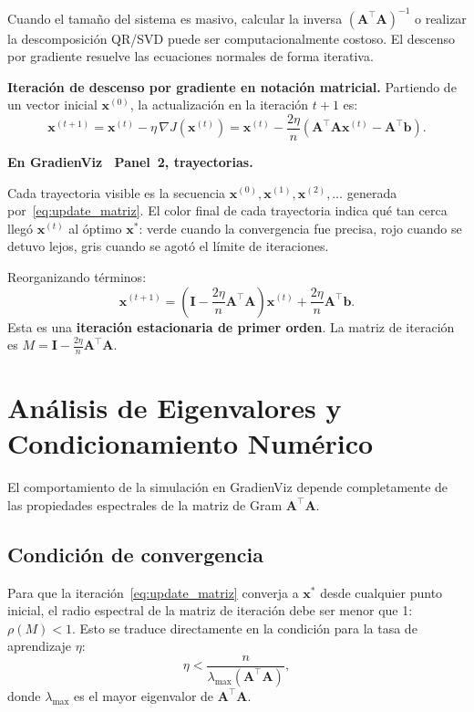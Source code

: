 ﻿\documentclass[12pt, a4paper]{article}
\newenvironment{viznota}[1]{%
    \begin{mdframed}[style=vizverde]
    \textbf{\color{bordeteo}En GradienViz \textemdash\ #1.}\quad
}{%
    \end{mdframed}
}
\newenvironment{vizdef}{%
    \begin{mdframed}[style=vizazul]
}{%
    \end{mdframed}
}
\newcommand{\grad}{\nabla}
\newcommand{\T}{{\top}}
\begin{document}
Cuando el tamaño del sistema es masivo, calcular la inversa $(\mathbf{A}^\T \mathbf{A})^{-1}$ o realizar la descomposición QR/SVD puede ser computacionalmente costoso. El descenso por gradiente resuelve las ecuaciones normales de forma iterativa.

\begin{vizdef}
\textbf{Iteración de descenso por gradiente en notación matricial.} Partiendo de un vector inicial $\mathbf{x}^{(0)}$, la actualización en la iteración $t+1$ es:
\begin{equation}\label{eq:update_matriz}
    \mathbf{x}^{(t+1)} = \mathbf{x}^{(t)} - \eta \, \grad J(\mathbf{x}^{(t)})
    = \mathbf{x}^{(t)} - \frac{2\eta}{n} \left(
        \mathbf{A}^\T \mathbf{A} \mathbf{x}^{(t)} - \mathbf{A}^\T \mathbf{b}
    \right).
\end{equation}
\end{vizdef}

\begin{viznota}{Panel~2, trayectorias}
Cada trayectoria visible es la secuencia $\mathbf{x}^{(0)}, \mathbf{x}^{(1)}, \mathbf{x}^{(2)}, \ldots$ generada por~\eqref{eq:update_matriz}. El color final de cada trayectoria indica qué tan cerca llegó $\mathbf{x}^{(t)}$ al óptimo $\mathbf{x}^*$: verde cuando la convergencia fue precisa, rojo cuando se detuvo lejos, gris cuando se agotó el límite de iteraciones.
\end{viznota}

Reorganizando términos:
\[
    \mathbf{x}^{(t+1)} = \left(
        \mathbf{I} - \frac{2\eta}{n} \mathbf{A}^\T \mathbf{A}
    \right) \mathbf{x}^{(t)} + \frac{2\eta}{n} \mathbf{A}^\T \mathbf{b}.
\]
Esta es una \textbf{iteración estacionaria de primer orden}. La matriz de iteración es $M = \mathbf{I} - \frac{2\eta}{n} \mathbf{A}^\T \mathbf{A}$.

\section{Análisis de Eigenvalores y Condicionamiento Numérico}

El comportamiento de la simulación en GradienViz depende completamente de las propiedades espectrales de la matriz de Gram $\mathbf{A}^\T \mathbf{A}$.

\subsection{Condición de convergencia}

Para que la iteración~\eqref{eq:update_matriz} converja a $\mathbf{x}^*$ desde cualquier punto inicial, el radio espectral de la matriz de iteración debe ser menor que 1: $\rho(M) < 1$. Esto se traduce directamente en la condición para la tasa de aprendizaje $\eta$:
\[
    \eta < \frac{n}{\lambda_{\max}(\mathbf{A}^\T \mathbf{A})},
\]
donde $\lambda_{\max}$ es el mayor eigenvalor de $\mathbf{A}^\T \mathbf{A}$.
\end{document}

